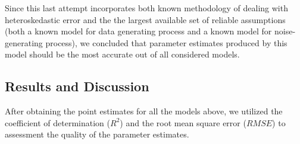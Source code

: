 \documentclass[letter,12pt]{article} %
\begin{document}
	Since this last attempt incorporates both known methodology of dealing with heteroskedastic error and the the largest available set of reliable assumptions (both a known model for data generating process and a known model for noise-generating process), we concluded that parameter estimates produced by this model should be the most accurate out of all considered models.
	
	
	\subsection*{Results and Discussion}
	
	After obtaining the point estimates for all the models above, we utilized the coefficient of determination ($R^2$) and the root mean square error ($RMSE$) to assessment the quality of the parameter estimates. 
	
\end{document}
